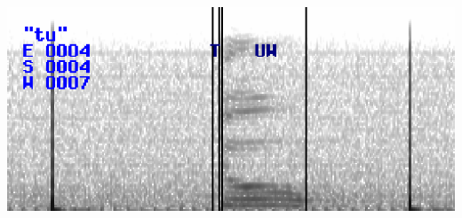 \documentclass{ContactProject}
\begin{document}
\begin{center}
\includegraphics[width=\textwidth]{images/tu}

\end{center}



		
\appendix





%

\end{document}
